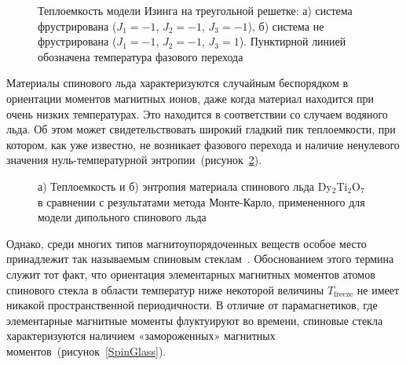  \begin{figure}[h]
 	\begin{minipage}[h]{0.49\linewidth}
 	\end{minipage}
 	\hfill
 	\begin{minipage}[h]{0.49\linewidth}
 	\end{minipage}
 	\caption{Теплоемкость модели Изинга на треугольной решетке: а) система фрустрирована ($J_1 = -1$, $J_2 = -1$, $J_3 = -1$), б) система не фрустрирована ($J_1 = -1$, $J_2 = -1$, $J_3 = 1$). Пунктирной линией обозначена температура фазового перехода}
 	\label{heatTriangleExpl}
 \end{figure}

Материалы спинового льда характеризуются случайным беспорядком в ориентации моментов магнитных ионов, даже когда материал находится при очень низких температурах. Это находится в соответствии со случаем водяного льда. Об этом может свидетельствовать широкий гладкий пик теплоемкости, при котором, как уже известно, не возникает фазового перехода и наличие ненулевого значения нуль-температурной энтропии~(рисунок~\ref{HeatAndEntropyExpl}). 

 \begin{figure}[h]
 	\begin{minipage}[h]{0.49\linewidth}
 	\end{minipage}
 	\hfill
 	\begin{minipage}[h]{0.49\linewidth}
 	\end{minipage}
 	\caption{а) Теплоемкость и б) энтропия материала спинового льда Dy$_2$Ti$_2$O$_7$ в сравнении с результатами метода Монте-Карло, примененного для модели дипольного спинового льда~\cite{bramwell2001}}
 	\label{HeatAndEntropyExpl}
 \end{figure}

Однако, среди многих типов магнитоупорядоченных веществ особое место принадлежит так называемым спиновым стеклам~\cite{diep2013,docenko1993}.  Обоснованием этого термина служит тот факт, что ориентация элементарных магнитных моментов атомов спинового стекла в области температур ниже некоторой величины $T_{\text{freeze}}$ не имеет никакой пространственной периодичности. В
отличие от парамагнетиков, где элементарные магнитные моменты флуктуируют во времени, спиновые стекла характеризуются наличием «замороженных» магнитных моментов~(рисунок~\ref{SpinGlass}).

